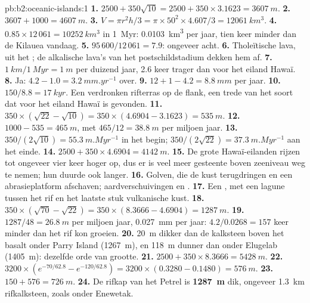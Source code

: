 \begin{solution}{pb:b2:oceanic-islands:1}
\textbf{1.} $2500 + 350\sqrt{10} = 2500 + 350\times3.1623 = \qty{3607}{m}$.
\textbf{2.} $3607 + 1000 = \qty{4607}{m}$.
\textbf{3.} $V = \pi r^2h/3 = \pi\times50^2\times4.607/3 = \qty{12061}{km^3}$.
\textbf{4.} $0.85\times12\,061 = \qty{10252}{km^3}$ in \qty{1}{Myr}: \qty{0.0103}{km^3} per jaar,
tien keer minder dan de Kilauea vandaag.
\textbf{5.} $95\,600/12\,061 = 7.9$: ongeveer acht.
\textbf{6.} Tholeïtische lava, uit het ; de alkalische lava's van het postschildstadium dekken
hem af.
\textbf{7.} $\qty{1}{km}/\qty{1}{Myr} = \qty{1}{m}$ per duizend jaar, 2.6 keer trager dan voor
het eiland Hawaï.
\textbf{8.} Ja: $4.2 - 1.0 = \qty{3.2}{mm.yr^{-1}}$ over.
\textbf{9.} $12 + 1 - 4.2 = \qty{8.8}{mm}$ per jaar.
\textbf{10.} $150/8.8 = \qty{17}{kyr}$. Een verdronken rifterras op de flank, een trede van het soort
dat voor het eiland Hawaï is gevonden.
\textbf{11.} $350\times(\sqrt{22} - \sqrt{10}) = 350\times(4.6904 - 3.1623) = \qty{535}{m}$.
\textbf{12.} $1000 - 535 = \qty{465}{m}$, met $465/12 = \qty{38.8}{m}$ per miljoen jaar.
\textbf{13.} $350/(2\sqrt{10}) = \qty{55.3}{m.Myr^{-1}}$ in het begin; $350/(2\sqrt{22}) =
\qty{37.3}{m.Myr^{-1}}$ aan het einde.
\textbf{14.} $2500 + 350\times4.6904 = \qty{4142}{m}$.
\textbf{15.} De grote Hawaï-eilanden rijzen tot ongeveer vier keer hoger op, dus er is veel meer
gesteente boven zeeniveau weg te nemen; hun  duurde ook langer.
\textbf{16.} Golven, die de kust terugdringen en een abrasieplatform afschaven; aardverschuivingen en
.
\textbf{17.} Een , met een lagune tussen het rif en het laatste stuk vulkanische kust.
\textbf{18.} $350\times(\sqrt{70} - \sqrt{22}) = 350\times(8.3666 - 4.6904) = \qty{1287}{m}$.
\textbf{19.} $1287/48 = \qty{26.8}{m}$ per miljoen jaar, \qty{0.027}{mm} per jaar: $4.2/0.0268 =
157$ keer minder dan het rif kon groeien.
\textbf{20.} \qty{20}{m} dikker dan de kalksteen boven het basalt onder Parry Island
(\qty{1267}{m}), en \qty{118}{m} dunner dan onder Elugelab (\qty{1405}{m}): dezelfde orde van grootte.
\textbf{21.} $2500 + 350\times8.3666 = \qty{5428}{m}$.
\textbf{22.} $3200\times(e^{-70/62.8} - e^{-120/62.8}) = 3200\times(0.3280 - 0.1480) =
\qty{576}{m}$.
\textbf{23.} $150 + 576 = \qty{726}{m}$.
\textbf{24.} De rifkap van het  Petrel is \textbf{\qty{1287}{m}} dik, ongeveer \qty{1.3}{km}
rifkalksteen, zoals onder Enewetak.
\end{solution}
